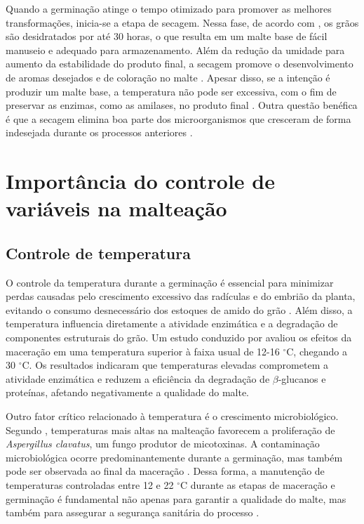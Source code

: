 Quando a germinação atinge o tempo otimizado para promover as melhores transformações, inicia-se a etapa de 
secagem. Nessa fase, de acordo com , os grãos são desidratados por até 
30 horas, o que resulta em um malte base de fácil manuseio e adequado para armazenamento. Além da redução da 
umidade para aumento da estabilidade do produto final, a secagem promove o desenvolvimento de aromas desejados 
e de coloração no malte \cite{BAMFORTH2003}. Apesar disso, se a intenção é produzir um malte base, a temperatura não 
pode ser excessiva, com o fim de preservar as enzimas, como as amilases, no produto final \cite{LEWIS2012}.
Outra questão benéfica é que a secagem elimina boa parte dos microorganismos que cresceram de forma indesejada 
durante os processos anteriores \cite{DOUGLAS1988, PETTERS1988}. 



\section{Importância do controle de variáveis na malteação}

\subsection{Controle de temperatura}

O controle da temperatura durante a germinação é essencial para minimizar perdas causadas pelo crescimento 
excessivo das radículas e do embrião da planta, evitando o consumo desnecessário dos estoques de amido do 
grão \cite{PITZ1990, MALLETT2022}. Além disso, a temperatura influencia diretamente a atividade enzimática 
e a degradação de componentes estruturais do grão. Um estudo conduzido por  avaliou 
os efeitos da maceração em uma temperatura superior à faixa usual de 12-16 $^{\circ}$C, chegando a 30 $^{\circ}$C. 
Os resultados indicaram que temperaturas elevadas comprometem a atividade enzimática e reduzem a eficiência da 
degradação de $\beta$-glucanos e proteínas, afetando negativamente a qualidade do malte.

Outro fator crítico relacionado à temperatura é o crescimento microbiológico. Segundo , 
temperaturas mais altas na malteação favorecem a proliferação de \textit{Aspergillus clavatus}, um fungo produtor 
de micotoxinas. A contaminação microbiológica ocorre predominantemente durante a germinação, mas também pode ser 
observada ao final da maceração \cite{PETTERS1988}. Dessa forma, a manutenção de temperaturas controladas entre 12 
e 22 $^{\circ}$C durante as etapas de maceração e germinação é fundamental não apenas para garantir a qualidade do 
malte, mas também para assegurar a segurança sanitária do processo \cite{TANGNI2002}.

